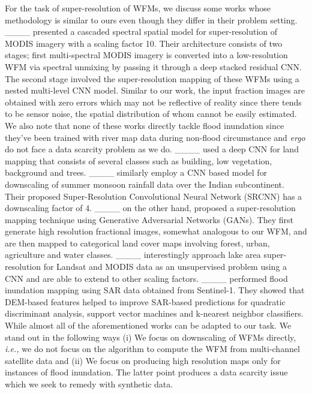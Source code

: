For the task of super-resolution of \acp{WFM}, we discuss some works whose methodology is similar to ours even though they differ in their problem setting. ____ presented a cascaded spectral spatial model for super-resolution of MODIS imagery with a scaling factor 10. Their architecture consists of two stages; first multi-spectral MODIS imagery is converted into a low-resolution \ac{WFM} via spectral unmixing by passing it through a deep stacked residual \ac{CNN}. The second stage involved the super-resolution mapping of these \acp{WFM} using a nested multi-level \ac{CNN} model. Similar to our work, the input fraction images are obtained with zero errors which may not be reflective of reality since there tends to be sensor noise, the spatial distribution of whom cannot be easily estimated. We also note that none of these works directly tackle flood inundation since they've been trained with river map data during non-flood circumstance and \textit{ergo} do not face a data scarcity problem as we do. 
____ used a deep \ac{CNN} for land mapping that consists of several classes such as building, low vegetation, background and trees. 
____ similarly employ a \ac{CNN} based model for downscaling of summer monsoon rainfall data over the Indian subcontinent. Their proposed Super-Resolution Convolutional Neural Network (SRCNN) has a downscaling factor of 4. 
____ on the other hand, proposed a super-resolution mapping technique using Generative Adversarial Networks (GANs). They first generate high resolution fractional images, somewhat analogous to our \ac{WFM}, and are then mapped to categorical land cover maps involving forest, urban, agriculture and water classes. 
____ interestingly approach lake area super-resolution for Landsat and MODIS data as an unsupervised problem using a \ac{CNN} and are able to extend to other scaling factors. ____ performed flood inundation mapping using \ac{SAR} data obtained from Sentinel-1. They showed that \ac{DEM}-based features helped to improve \ac{SAR}-based predictions for quadratic discriminant analysis, support vector machines and k-nearest neighbor classifiers. While almost all of the aforementioned works can be adapted to our task. We stand out in the following ways (i) We focus on downscaling of \acp{WFM} directly, \textit{i.e.,} we do not focus on the algorithm to compute the \ac{WFM} from multi-channel satellite data and (ii) We focus on producing high resolution maps only for instances of flood inundation. The latter point produces a data scarcity issue which we seek to remedy with synthetic data. 


